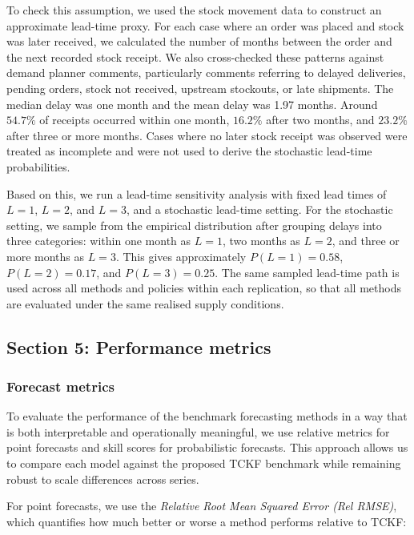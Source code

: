 \documentclass[
  authoryear,
  doubleblind,
  3p]{elsarticle}
\begin{document}
To check this assumption, we used the stock movement data to construct
an approximate lead-time proxy. For each case where an order was placed
and stock was later received, we calculated the number of months between
the order and the next recorded stock receipt. We also cross-checked
these patterns against demand planner comments, particularly comments
referring to delayed deliveries, pending orders, stock not received,
upstream stockouts, or late shipments. The median delay was one month
and the mean delay was 1.97 months. Around \(54.7\%\) of receipts
occurred within one month, \(16.2\%\) after two months, and \(23.2\%\)
after three or more months. Cases where no later stock receipt was
observed were treated as incomplete and were not used to derive the
stochastic lead-time probabilities.

Based on this, we run a lead-time sensitivity analysis with fixed lead
times of \(L=1\), \(L=2\), and \(L=3\), and a stochastic lead-time
setting. For the stochastic setting, we sample from the empirical
distribution after grouping delays into three categories: within one
month as \(L=1\), two months as \(L=2\), and three or more months as
\(L=3\). This gives approximately \(P(L=1)=0.58\), \(P(L=2)=0.17\), and
\(P(L=3)=0.25\). The same sampled lead-time path is used across all
methods and policies within each replication, so that all methods are
evaluated under the same realised supply conditions.

\pagebreak

\pagebreak

\subsection{Section 5: Performance metrics}\label{sec-appendix_wp2_4}

\subsubsection{Forecast metrics}\label{forecast-metrics}

To evaluate the performance of the benchmark forecasting methods in a
way that is both interpretable and operationally meaningful, we use
relative metrics for point forecasts and skill scores for probabilistic
forecasts. This approach allows us to compare each model against the
proposed TCKF benchmark while remaining robust to scale differences
across series.

For point forecasts, we use the \emph{Relative Root Mean Squared Error
(Rel RMSE)}, which quantifies how much better or worse a method performs
relative to TCKF:
\end{document}
